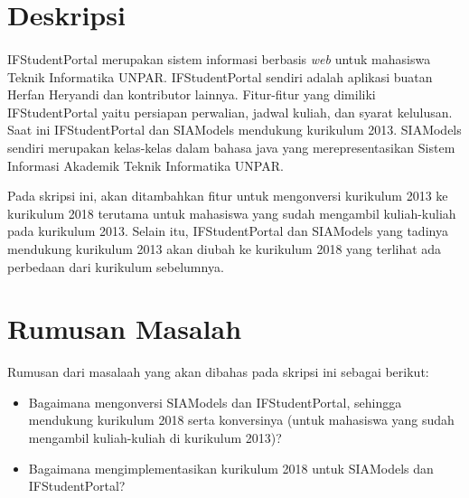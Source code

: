 \documentclass[a4paper,twoside]{article}
\begin{document}
\title{\@judultopik}
\author{\nama \textendash \@npm} 

\newcommand{\nama}{Andrianto Sugiarto}
\newcommand{\@npm}{2013730046}
\newcommand{\@judultopik}{Migrasi SIAModels dan IFStudentPortal ke Kurikulum 2018} %
\newcommand{\jumpemb}{1} %
\newcommand{\tanggal}{26/01/2018}
\maketitle


\section{Deskripsi}

\paragraph{} IFStudentPortal merupakan sistem informasi berbasis \textit{web} untuk mahasiswa Teknik Informatika UNPAR. IFStudentPortal sendiri adalah aplikasi buatan Herfan Heryandi dan kontributor lainnya. Fitur-fitur yang dimiliki IFStudentPortal yaitu persiapan perwalian, jadwal kuliah, dan syarat kelulusan. Saat ini IFStudentPortal dan SIAModels mendukung kurikulum 2013. SIAModels sendiri merupakan kelas-kelas dalam bahasa java yang merepresentasikan Sistem Informasi Akademik Teknik Informatika UNPAR.

Pada skripsi ini, akan ditambahkan fitur untuk mengonversi kurikulum 2013 ke kurikulum 2018 terutama untuk mahasiswa yang sudah mengambil kuliah-kuliah pada kurikulum 2013. Selain itu, IFStudentPortal dan SIAModels yang tadinya mendukung kurikulum 2013 akan diubah ke kurikulum 2018 yang terlihat ada perbedaan dari kurikulum sebelumnya.



\section{Rumusan Masalah}
Rumusan dari masalaah yang akan dibahas pada skripsi ini sebagai berikut:
\begin{itemize}
	\item Bagaimana mengonversi SIAModels dan IFStudentPortal, sehingga mendukung kurikulum 2018 serta konversinya (untuk mahasiswa yang sudah mengambil kuliah-kuliah di kurikulum 2013)?
	\item Bagaimana mengimplementasikan kurikulum 2018 untuk SIAModels dan IFStudentPortal?
\end{itemize}
\end{document}

